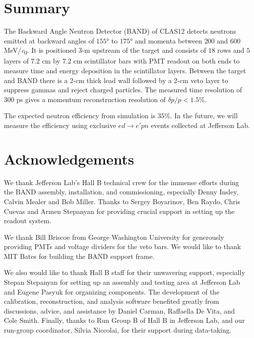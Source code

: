 \documentclass[review,number,sort&compress]{elsarticle}
\begin{document}
\section{Summary}
The Backward Angle Neutron Detector (BAND) of CLAS12 detects neutrons
  emitted at backward angles of $155$\si{\degree} to $175$\si{\degree}
  and momenta between $200$ and $600$ \si{\MeV/\clight}. It is
  positioned 3-\si{\meter} upstream of the target and consists of $18$
  rows and $5$ layers of $7.2$ \si{\centi\meter} by $7.2$
  \si{\centi\meter} scintillator bars with PMT readout on both ends to
  measure time and energy deposition in the scintillator
  layers. Between the target and BAND there is a 2-\si{\centi\meter}
  thick lead wall followed by a 2-\si{\centi\meter} veto layer to
  suppress gammas and reject charged particles. The measured time
  resolution of 300 ps gives a momentum
  reconstruction resolution of $\delta p/p < 1.5$\%.
 

The expected neutron efficiency from simulation is $35$\%. In the
future, we will measure the efficiency using exclusive $ed \rightarrow e'pn$
events collected at Jefferson Lab.


\section*{Acknowledgements}
We thank Jefferson Lab's Hall B technical crew for the immense efforts during the BAND assembly, installation, and commissioning, especially Denny Insley, Calvin Mealer and Bob Miller. Thanks to Sergey Boyarinov, Ben Raydo, Chris Cuevas and Armen Stepanyan for providing crucial support in setting up the readout system.

We thank Bill Briscoe from George Washington University for generously providing PMTs and voltage dividers for the veto bars. We would like to thank MIT Bates for building the BAND support frame. 

We also would like to thank Hall B staff for their unwavering support, especially Stepan Stepanyan for setting up an assembly and testing area at Jefferson Lab and Eugene Pasyuk for organizing components. The development of the calibration, reconstruction, and analysis software benefited greatly from discussions, advice, and assistance by Daniel Carman, Raffaella De Vita, and Cole Smith. Finally, thanks to Run Group B of Hall B in Jefferson Lab, and our run-group coordinator, Silvia Niccolai, for their support during data-taking.
\end{document}
